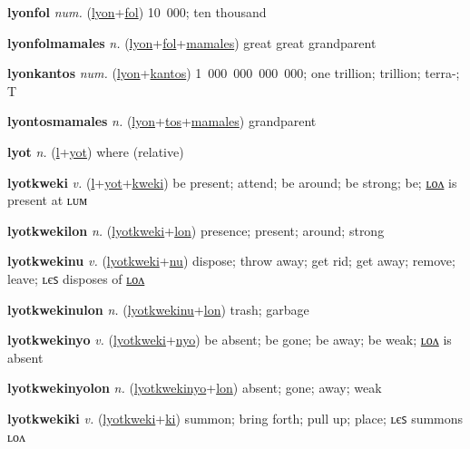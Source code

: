 \textbf{\hypertarget{lyonfol}{lyonfol}} \textit{num.} (\hyperlink{lyon}{lyon}+\allowbreak \hyperlink{fol}{fol})
10~000; ten thousand

\textbf{\hypertarget{lyonfolmamales}{lyonfolmamales}} \textit{n.} (\hyperlink{lyon}{lyon}+\allowbreak \hyperlink{fol}{fol}+\allowbreak \hyperlink{mamales}{mamales})
great great grandparent

\textbf{\hypertarget{lyonkantos}{lyonkantos}} \textit{num.} (\hyperlink{lyon}{lyon}+\allowbreak \hyperlink{kantos}{kantos})
1~000~000~000~000; one trillion; trillion; terra-; T

\textbf{\hypertarget{lyontosmamales}{lyontosmamales}} \textit{n.} (\hyperlink{lyon}{lyon}+\allowbreak \hyperlink{tos}{tos}+\allowbreak \hyperlink{mamales}{mamales})
grandparent

\textbf{\hypertarget{lyot}{lyot}} \textit{n.} (\hyperlink{l}{l}+\allowbreak \hyperlink{yot}{yot})
where (relative)

\textbf{\hypertarget{lyotkweki}{lyotkweki}} \textit{v.} (\hyperlink{l}{l}+\allowbreak \hyperlink{yot}{yot}+\allowbreak \hyperlink{kweki}{kweki})
be present; attend; be around; be strong; be; \hyperlink{lyotkwekilon}{ʟᴏᴧ} is present at ʟᴜᴍ

\textbf{\hypertarget{lyotkwekilon}{lyotkwekilon}} \textit{n.} (\hyperlink{lyotkweki}{lyotkweki}+\allowbreak \hyperlink{lon}{lon})
presence; present; around; strong

\textbf{\hypertarget{lyotkwekinu}{lyotkwekinu}} \textit{v.} (\hyperlink{lyotkweki}{lyotkweki}+\allowbreak \hyperlink{nu}{nu})
dispose; throw away; get rid; get away; remove; leave; ʟєꜱ disposes of \hyperlink{lyotkwekinulon}{ʟᴏᴧ}

\textbf{\hypertarget{lyotkwekinulon}{lyotkwekinulon}} \textit{n.} (\hyperlink{lyotkwekinu}{lyotkwekinu}+\allowbreak \hyperlink{lon}{lon})
trash; garbage

\textbf{\hypertarget{lyotkwekinyo}{lyotkwekinyo}} \textit{v.} (\hyperlink{lyotkweki}{lyotkweki}+\allowbreak \hyperlink{nyo}{nyo})
be absent; be gone; be away; be weak; \hyperlink{lyotkwekinyolon}{ʟᴏᴧ} is absent

\textbf{\hypertarget{lyotkwekinyolon}{lyotkwekinyolon}} \textit{n.} (\hyperlink{lyotkwekinyo}{lyotkwekinyo}+\allowbreak \hyperlink{lon}{lon})
absent; gone; away; weak

\textbf{\hypertarget{lyotkwekiki}{lyotkwekiki}} \textit{v.} (\hyperlink{lyotkweki}{lyotkweki}+\allowbreak \hyperlink{ki}{ki})
summon; bring forth; pull up; place; ʟєꜱ summons ʟᴏᴧ

